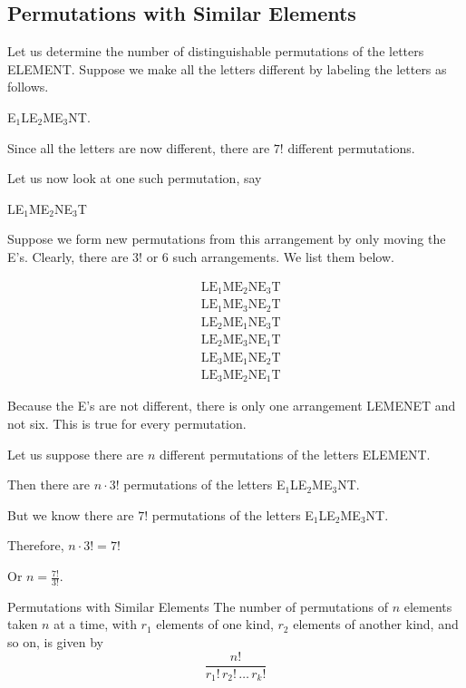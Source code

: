 \subsection{Permutations with Similar Elements}\label{subsection_permutations_with_similar_elements}

Let us determine the number of distinguishable permutations of the letters ELEMENT. Suppose we make all the letters different by labeling the letters as follows.

E$_1$LE$_2$ME$_3$NT.

Since all the letters are now different, there are $7!$ different permutations.

Let us now look at one such permutation, say

LE$_1$ME$_2$NE$_3$T

Suppose we form new permutations from this arrangement by only moving the E's. Clearly, there are $3!$ or 6 such arrangements. We list them below.

\begin{align*}
     & \text{LE$_1$ME$_2$NE$_3$T} \\
     & \text{LE$_1$ME$_3$NE$_2$T} \\
     & \text{LE$_2$ME$_1$NE$_3$T} \\
     & \text{LE$_2$ME$_3$NE$_1$T} \\
     & \text{LE$_3$ME$_1$NE$_2$T} \\
     & \text{LE$_3$ME$_2$NE$_1$T}
\end{align*}

Because the E's are not different, there is only one arrangement LEMENET and not six. This is true for every permutation.

Let us suppose there are \( n \) different permutations of the letters ELEMENT.

Then there are \( n \cdot 3! \) permutations of the letters E$_1$LE$_2$ME$_3$NT.

But we know there are \( 7! \) permutations of the letters E$_1$LE$_2$ME$_3$NT.

Therefore, \( n \cdot 3! = 7! \)

Or \( n = \frac{7!}{3!} \).


\begin{summarybox}{Permutations with Similar Elements}
    The number of permutations of \( n \) elements taken \( n \) at a time, with \( r_1 \) elements of one kind, \( r_2 \) elements of another kind, and so on, is given by
    \[
        \frac{n!}{r_1! \, r_2! \, \dots \, r_k!}
    \]
\end{summarybox}

